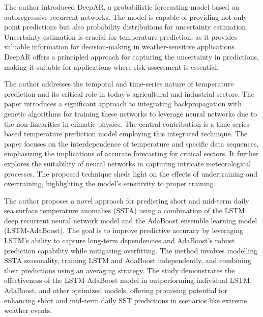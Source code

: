 \documentclass[sn-mathphys,Numbered]{sn-jnl}
\theoremstyle{thmstyleone}
\theoremstyle{thmstyletwo}
\theoremstyle{thmstylethree}
\begin{document}
\cite{salinas2020deepar}The author introduced DeepAR, a probabilistic forecasting model based on autoregressive recurrent networks. The model is capable of providing not only point predictions but also probability distributions for uncertainty estimation. Uncertainty estimation is crucial for temperature prediction, as it provides valuable information for decision-making in weather-sensitive applications. DeepAR offers a principled approach for capturing the uncertainty in predictions, making it suitable for applications where risk assessment is essential.

\cite{singh2011time} The author addresses the temporal and time-series nature of temperature prediction and its critical role in today's agricultural and industrial sectors. The paper introduces a significant approach to integrating backpropagation with genetic algorithms for training these networks to leverage neural networks due to the non-linearities in climatic physics. The central contribution is a time series-based temperature prediction model employing this integrated technique. The paper focuses on the interdependence of temperature and specific data sequences, emphasizing the implications of accurate forecasting for critical sectors. It further explores the suitability of neural networks in capturing intricate meteorological processes. The proposed technique sheds light on the effects of undertraining and overtraining, highlighting the model's sensitivity to proper training.

\cite{XIAO2019111358} The author proposes a novel approach for predicting short and mid-term daily sea surface temperature anomalies (SSTA) using a combination of the LSTM deep recurrent neural network model and the AdaBoost ensemble learning model (LSTM-AdaBoost). The goal is to improve predictive accuracy by leveraging LSTM's ability to capture long-term dependencies and AdaBoost's robust prediction capability while mitigating overfitting. The method involves modelling SSTA seasonality, training LSTM and AdaBoost independently, and combining their predictions using an averaging strategy. The study demonstrates the effectiveness of the LSTM-AdaBoost model in outperforming individual LSTM, AdaBoost, and other optimized models, offering promising potential for enhancing short and mid-term daily SST predictions in scenarios like extreme weather events.
\end{document}
